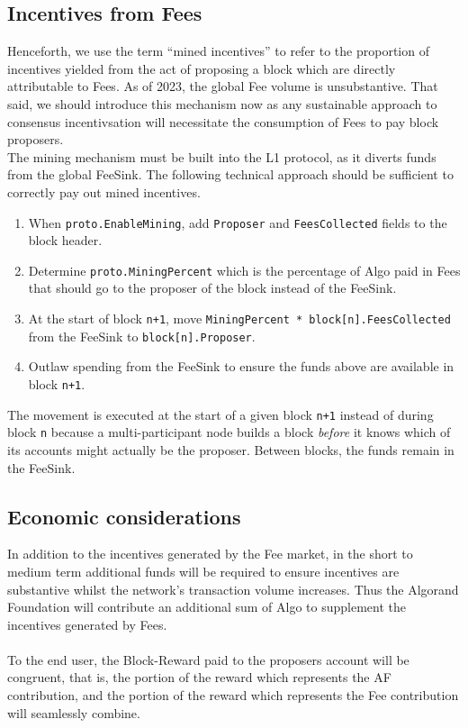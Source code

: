 \documentclass[11pt,a4paper]{article}
\begin{document}
\subsection{Incentives from Fees}
Henceforth, we use the term “mined incentives” to refer to the proportion of incentives yielded from the act of 
proposing a block which are directly attributable to Fees. As of 2023, the global Fee volume is unsubstantive. That 
said, we should introduce this mechanism now as any sustainable approach to consensus incentivsation will necessitate 
the consumption of Fees to pay block proposers. \\

The mining mechanism must be built into the L1 protocol, as it diverts funds from the global \gls{FeeSink}. The 
following technical approach should be sufficient to correctly pay out mined incentives.

\begin{enumerate}
    \item When \texttt{proto.EnableMining}, add \texttt{Proposer} and \texttt{FeesCollected} fields to the block header.
    \item Determine \texttt{proto.MiningPercent} which is the percentage of Algo paid in Fees that should go to the 
          proposer of the block instead of the \gls{FeeSink}.
    \item At the start of block \texttt{n+1}, move \texttt{MiningPercent * block[n].FeesCollected} from the 
          \gls{FeeSink} to \texttt{block[n].Proposer}.
    \item Outlaw spending from the \gls{FeeSink} to ensure the funds above are available in block \texttt{n+1}.
\end{enumerate}

The movement is executed at the start of a given block \texttt{n+1} instead of during block \texttt{n} because a 
multi-participant node builds a block \textit{before} it knows which of its accounts might actually be the proposer. 
Between blocks, the funds remain in the \gls{FeeSink}.

\subsection{Economic considerations} \label{subsec:eco}
In addition to the incentives generated by the Fee market, in the short to medium term additional funds will be required
to ensure incentives are substantive whilst the network's transaction volume increases. Thus the Algorand Foundation 
will contribute an additional sum of Algo to supplement the incentives generated by Fees. \\ \\
To the end user, the \gls{Block-Reward} paid to the proposers account will be congruent, that is, the portion of the
reward which represents the AF contribution, and the portion of the reward which represents the Fee contribution will
seamlessly combine.
\end{document}
